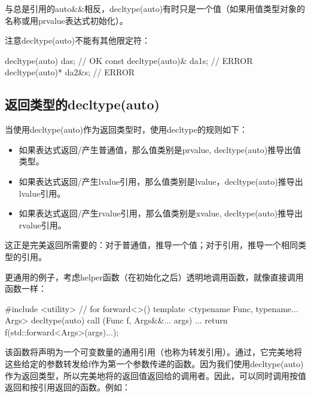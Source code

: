 与总是引用的auto\&\&相反，decltype(auto)有时只是一个值（如果用值类型对象的名称或用prvalue表达式初始化）。

注意decltype(auto)不能有其他限定符：

\begin{cppcode}
decltype(auto) da{s}; // OK
const decltype(auto)& da1{s}; // ERROR
decltype(auto)* da2{&s}; // ERROR
\end{cppcode}

\subsection{返回类型的decltype(auto)}

当使用decltype(auto)作为返回类型时，使用decltype的规则如下：

\begin{itemize}
	\item 如果表达式返回/产生普通值，那么值类别是prvalue, decltype(auto)推导出值类型。
	\item 如果表达式返回/产生lvalue引用，那么值类别是lvalue，decltype(auto)推导出lvalue引用。
	\item 如果表达式返回/产生rvalue引用，那么值类别是xvalue, decltype(auto)推导出rvalue引用。
\end{itemize}

这正是完美返回所需要的：对于普通值，推导一个值；对于引用，推导一个相同类型的引用。

更通用的例子，考虑helper函数（在初始化之后）透明地调用函数，就像直接调用函数一样：

\begin{cppcode}
#include <utility> // for forward<>()
template <typename Func, typename... Args>
decltype(auto) call (Func f, Args&&... args)
{
	...
	return f(std::forward<Args>(args)...);
}
\end{cppcode}

该函数将声明为一个可变数量的通用引用（也称为转发引用）。通过，它完美地将这些给定的参数转发给f作为第一个参数传递的函数。因为我们使用decltype(auto)作为返回类型，所以完美地将的返回值返回给的调用者。因此，可以同时调用按值返回和按引用返回的函数。例如：

